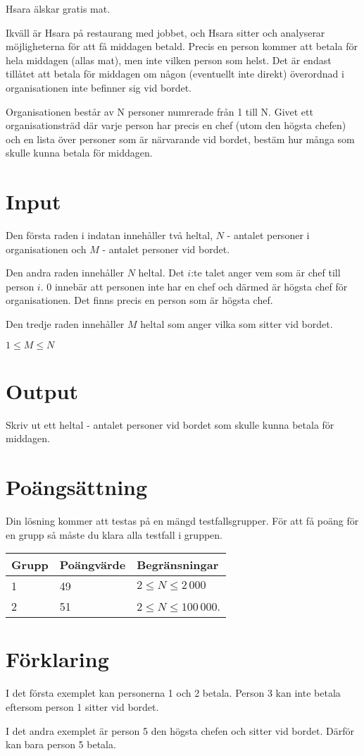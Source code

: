 
Hsara älskar gratis mat.

Ikväll är Hsara på restaurang med jobbet, och Hsara sitter och analyserar möjligheterna för att få middagen betald. Precis en person kommer att betala för hela middagen (allas mat), men inte vilken person som helst. Det är endast tillåtet att betala för middagen om någon (eventuellt inte direkt) överordnad i organisationen inte befinner sig vid bordet.

Organisationen består av N personer numrerade från 1 till N. Givet ett organisationsträd där varje person har precis en chef (utom den högsta chefen) och en lista över personer som är närvarande vid bordet, bestäm hur många som skulle kunna betala för middagen.

\section*{Input}

Den första raden i indatan innehåller två heltal, $N$ - antalet personer i organisationen och $M$ - antalet personer vid bordet.

Den andra raden innehåller $N$ heltal. Det $i$:te talet anger vem som är chef till person $i$. 0 innebär att personen inte har en chef och därmed är högsta chef för organisationen. Det finns precis en person som är högsta chef.

Den tredje raden innehåller $M$ heltal som anger vilka som sitter vid bordet.

$1 \le M \le N$

\section*{Output}

Skriv ut ett heltal - antalet personer vid bordet som skulle kunna betala för middagen.

\section*{Poängsättning}
Din lösning kommer att testas på en mängd testfallsgrupper. För att få poäng för en grupp så måste du klara alla testfall i gruppen.

\begin{tabular}{| l | l | l |}
	\hline
	Grupp & Poängvärde & Begränsningar\\ \hline
  1     & 49         & $2 \le N \le 2\,000$ \\ \hline
  2     & 51         & $2 \le N \le 100\,000$. \\ \hline
\end{tabular}

\section*{Förklaring}
I det första exemplet kan personerna 1 och 2 betala. Person 3 kan inte betala eftersom person 1 sitter vid bordet.

I det andra exemplet är person 5 den högsta chefen och sitter vid bordet. Därför kan bara person 5 betala.
